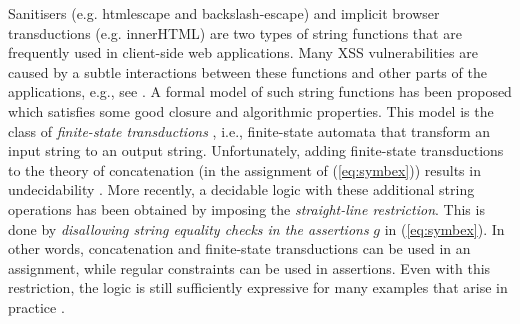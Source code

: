 
Sanitisers (e.g. htmlescape and backslash-escape)
and implicit browser transductions (e.g. innerHTML)
are two types of string functions that are frequently used in client-side
web applications. Many XSS vulnerabilities are caused by
a subtle interactions between these functions and other parts of the
applications, e.g., see \cite{web-model,Kern14,DV13,LB16,mXSS}. A formal 
model of such string functions has been proposed which satisfies some
good closure and algorithmic properties. This model is the class of
\emph{finite-state transductions}
\cite{BEK,web-model,DV13,symbolic-transducer,LB16}, i.e.,
finite-state automata that transform an input string to an output string. 
Unfortunately, adding finite-state transductions to
the theory of concatenation (in the assignment of (\ref{eq:symbex})) results in 
undecidability \cite{LB16}.
More recently, a decidable logic with these additional string 
operations \cite{LB16} has been obtained by imposing 
the \emph{straight-line restriction}. %
This is done 
by \emph{disallowing string equality checks in the assertions} $g$ in 
(\ref{eq:symbex}). In other words, concatenation and finite-state transductions
can be used in an assignment, while regular constraints can be used in
assertions. Even with this restriction, the logic is still 
sufficiently expressive
for many examples that arise in practice \cite{LB16,HJLRV18}.




